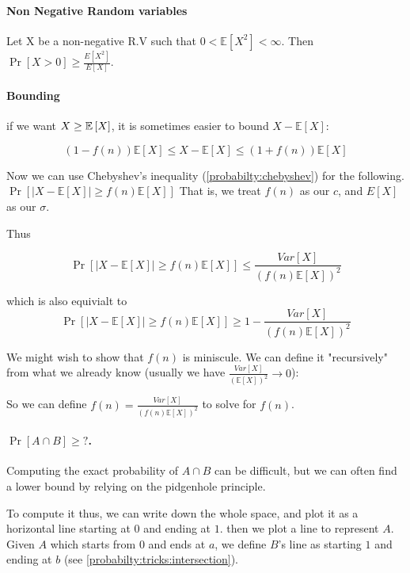 \paragraph{\bf Non Negative Random variables}
Let X be a non-negative R.V such that $0<\mathbb{E}[X^2]<\infty$. Then 
$\Pr[X>0]\ge \frac{E[X^2]}{E[X]}$.

\paragraph{\bf Bounding}
if we want $X\ge \mathbb{E}\left[X\right]$, it is sometimes easier to bound $X-\mathbb{E}[{X}]$:

$$\left(1-f\left(n\right)\right)\mathbb{E}[{X}]\le X-\mathbb{E}[{X}]\le\left(1+f\left(n\right)\right)\mathbb{E}[{X}]$$

Now we can use Chebyshev's inequality (\autoref{probabilty:chebyshev}) for the following.
$\Pr[\left|X-\mathbb{E}[X]\right|\ge f\left(n\right)\mathbb{E}[{X}]]$
That is, we treat $f(n)$ as our $c$, and $E[X]$ as our $\sigma$.

Thus 

$$\Pr\left[\left|X-\mathbb{E}[X]\right|\ge f\left(n\right)\mathbb{E}[{X}]\right]\le\frac{Var\left[X\right]}{\left(f\left(n\right)\mathbb{E}[{X}]\right)^{2}}
$$
\begin{insight}
    which is also equivialt to 
    $$\Pr\left[\left|X-\mathbb{E}[X]\right|\ge f\left(n\right)\mathbb{E}[{X}]\right]\ge 1 - \frac{Var\left[X\right]}{\left(f(n)\mathbb{E}[{X}]\right)^{2}}
$$
\end{insight}


We might wish to show that $f(n)$ is miniscule. We can define it "recursively" from what we already know (usually we have $\frac{Var\left[X\right]}{\left(\mathbb{E}[{X}]\right)^{2}}\to 0$):

So we can define $f(n)= \frac{Var\left[X\right]}{\left(f(n)\mathbb{E}[{X}]\right)^{2}}$ to solve for $f(n)$.


\paragraph{\bf $\Pr{[A\cap B]}\ge ?$.}
Computing the exact probability of $A\cap B$ can be difficult, but we can often find a lower bound
by relying on the pidgenhole principle.

To compute it thus, we can write down the whole space, and plot it as a 
horizontal line starting at $0$ and ending at $1$.
then we plot a line to represent $A$. Given $A$ which starts from $0$ and ends at $a$,
we define $B$'s line as starting $1$ and ending at $b$ (see \autoref{probabilty:tricks:intersection}).

